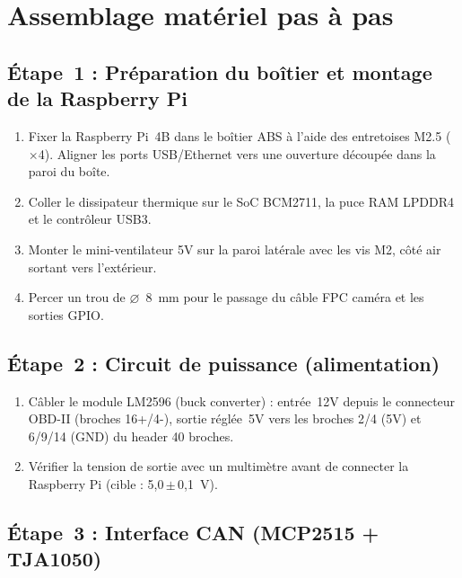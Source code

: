 \documentclass[12pt,a4paper]{report}
\begin{document}
\section{Assemblage mat\'eriel pas \`a pas}

\subsection{\'Etape~1 : Pr\'eparation du boîtier et montage de la Raspberry Pi}

\begin{enumerate}
  \item Fixer la Raspberry Pi~4B dans le boîtier ABS \`a l'aide des entretoises M2.5 ($\times$4). Aligner les ports USB/Ethernet vers une ouverture d\'ecoup\'ee dans la paroi du bo\^ite.
  \item Coller le dissipateur thermique sur le SoC BCM2711, la puce RAM LPDDR4 et le contr\^oleur USB3.
  \item Monter le mini-ventilateur 5V sur la paroi lat\'erale avec les vis M2, c\^oté air sortant vers l'ext\'erieur.
  \item Percer un trou de $\varnothing$~8~mm pour le passage du c\^able FPC cam\'era et les sorties GPIO.
\end{enumerate}

\subsection{\'Etape~2 : Circuit de puissance (alimentation)}

\begin{enumerate}
  \item C\^abler le module LM2596 (buck converter) : entr\'ee~12V depuis le connecteur OBD-II (broches 16+/4-), sortie r\'egl\'ee~5V vers les broches 2/4 (5V) et 6/9/14 (GND) du header 40 broches.
  \item V\'erifier la tension de sortie avec un multim\`etre avant de connecter la Raspberry Pi (cible : 5,0\,$\pm$\,0,1~V).
\end{enumerate}

\subsection{\'Etape~3 : Interface CAN (MCP2515 + TJA1050)}
\end{document}
